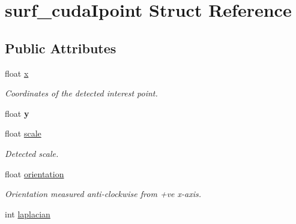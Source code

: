 \hypertarget{structsurf__cudaIpoint}{\section{surf\-\_\-cuda\-Ipoint Struct Reference}
\label{structsurf__cudaIpoint}
}
\subsection*{Public Attributes}
\begin{DoxyCompactItemize}
\item 
\hypertarget{structsurf__cudaIpoint_a7060fd8fcfa5ba8d68cc75f1b666294a}{float \hyperlink{structsurf__cudaIpoint_a7060fd8fcfa5ba8d68cc75f1b666294a}{x}}\label{structsurf__cudaIpoint_a7060fd8fcfa5ba8d68cc75f1b666294a}

\begin{DoxyCompactList}\small\item\em Coordinates of the detected interest point. \end{DoxyCompactList}\item 
\hypertarget{structsurf__cudaIpoint_a09edc6accce82c496b35466e204d8ba8}{float {\bfseries y}}\label{structsurf__cudaIpoint_a09edc6accce82c496b35466e204d8ba8}

\item 
\hypertarget{structsurf__cudaIpoint_ad5da0b86ff95c812fd3246cf5d034d72}{float \hyperlink{structsurf__cudaIpoint_ad5da0b86ff95c812fd3246cf5d034d72}{scale}}\label{structsurf__cudaIpoint_ad5da0b86ff95c812fd3246cf5d034d72}

\begin{DoxyCompactList}\small\item\em Detected scale. \end{DoxyCompactList}\item 
\hypertarget{structsurf__cudaIpoint_a2a17a4c0770658e6ab56b46667485f57}{float \hyperlink{structsurf__cudaIpoint_a2a17a4c0770658e6ab56b46667485f57}{orientation}}\label{structsurf__cudaIpoint_a2a17a4c0770658e6ab56b46667485f57}

\begin{DoxyCompactList}\small\item\em Orientation measured anti-\/clockwise from +ve x-\/axis. \end{DoxyCompactList}\item 
\hypertarget{structsurf__cudaIpoint_a79b61d44e8fa9a2f2080856a60f80b48}{int \hyperlink{structsurf__cudaIpoint_a79b61d44e8fa9a2f2080856a60f80b48}{laplacian}}\label{structsurf__cudaIpoint_a79b61d44e8fa9a2f2080856a60f80b48}


\end{DoxyCompactItemize}
